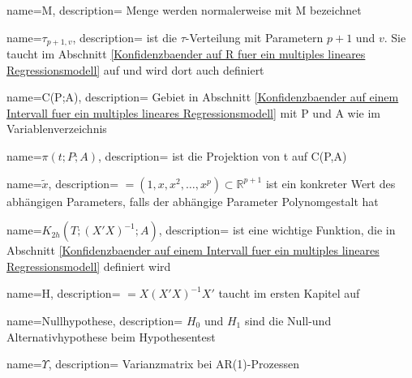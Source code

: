 
{
    name=M,
    description={ Menge werden normalerweise mit M bezeichnet}
} 

{
    name=$\tau_{p+1,v}$,
    description={ ist die $\tau$-Verteilung mit Parametern $p+1$ und $v$. Sie taucht im Abschnitt \ref{Konfidenzbaender auf R fuer ein multiples lineares Regressionsmodell} auf und wird dort auch definiert}
} 

{
    name=C(P;A),
    description={ Gebiet in Abschnitt \ref{Konfidenzbaender auf einem Intervall fuer ein multiples lineares Regressionsmodell} mit P und A wie im Variablenverzeichnis}
}

{
    name=$\pi(t;P;A)$,
    description={ ist die Projektion von t auf C(P,A)}
}

{
    name=$\tilde{x}$,
    description={ $=(1, x, x^2, \ldots, x^p) \subset \mathbb{R}^{p+1}$ ist ein konkreter Wert des abhängigen Parameters, falls der abhängige Parameter Polynomgestalt hat}
}

{
    name=$K_{2h}(T;(X'X)^{-1};A)$,
    description={ ist eine wichtige Funktion, die in Abschnitt \ref{Konfidenzbaender auf einem Intervall fuer ein multiples lineares Regressionsmodell} definiert wird}
}

{
    name=H,
    description={ $=X(X'X)^{-1}X'$ taucht im ersten Kapitel auf}
}  

{
    name=Nullhypothese,
    description={ $H_0$ und $H_1$ sind die Null-und Alternativhypothese beim Hypothesentest}
}

{
    name=$\Upsilon$,
    description={ Varianzmatrix bei AR(1)-Prozessen}
}



